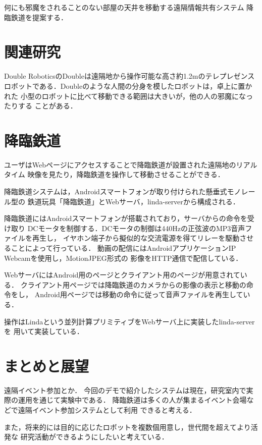 \documentclass[submit,techreq]{ipsj}
\begin{document}
何にも邪魔をされることのない部屋の天井を移動する遠隔情報共有システム
降臨鉄道を提案する．

\section{関連研究}

Double RoboticsのDoubleは遠隔地から操作可能な高さ約1.2mのテレプレゼンス
ロボットである．Doubleのような人間の分身を模したロボットは，卓上に置かれた
小型のロボットに比べて移動できる範囲は大きいが，他の人の邪魔になったりする
ことがある．
\cite{Hirota:Korin}

\footnotetext{}

\section{降臨鉄道}

ユーザはWebページにアクセスすることで降臨鉄道が設置された遠隔地のリアルタイム
映像を見たり，降臨鉄道を操作して移動させることができる．

降臨鉄道システムは，Androidスマートフォンが取り付けられた懸垂式モノレール型の
鉄道玩具「降臨鉄道」とWebサーバ，linda-serverから構成される．

降臨鉄道にはAndroidスマートフォンが搭載されており，サーバからの命令を受け取り
DCモータを制御する．DCモータの制御は440Hzの正弦波のMP3音声ファイルを再生し，
イヤホン端子から擬似的な交流電源を得てリレーを駆動させることによって行っている．
動画の配信にはAndroidアプリケーションIP Webcamを使用し，MotionJPEG形式の
影像をHTTP通信で配信している．

WebサーバにはAndroid用のページとクライアント用のページが用意されている．
クライアント用ページでは降臨鉄道のカメラからの影像の表示と移動の命令をし，
Android用ページでは移動の命令に従って音声ファイルを再生している．

操作はLindaという並列計算プリミティブをWebサーバ上に実装したlinda-serverを
用いて実装している．

\section{まとめと展望}

遠隔イベント参加とか．
今回のデモで紹介したシステムは現在，研究室内で実際の運用を通じて実験中である．
降臨鉄道は多くの人が集まるイベント会場などで遠隔イベント参加システムとして利用
できると考える．

また，将来的には目的に応じたロボットを複数個用意し，世代間を超えてより活発な
研究活動ができるようにしたいと考えている．




\end{document}
